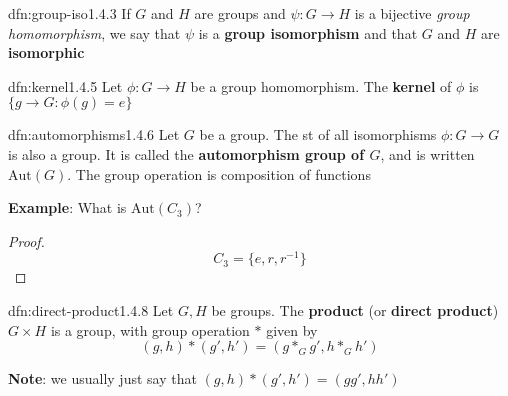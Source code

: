 \documentclass{article}
\begin{document}
\begin{dfn}{dfn:group-iso}{1.4.3}
    If $G$ and $H$ are groups and $\psi : G \to H$ is a bijective \textit{group homomorphism}, we say that $\psi$ is a \textbf{group isomorphism} and that $G$ and $H$ are \textbf{isomorphic}
\end{dfn}

\begin{dfn}{dfn:kernel}{1.4.5}
    Let $\phi : G \to H$ be a group homomorphism. The \textbf{kernel} of $\phi$ is $\{g \to G : \phi(g) = e\}$
\end{dfn}

\begin{dfn}[Automorphisms]{dfn:automorphisms}{1.4.6}
    Let $G$ be a group. The st of all isomorphisms $\phi : G \to G$ is also a group. It is called the \textbf{automorphism group of $G$}, and is written $\mathrm{Aut}(G)$. The group operation is composition of functions
\end{dfn}

\textbf{Example}: What is $\mathrm{Aut}(C_{3})$?
\begin{proof}
    \[C_{3} = \{e, r, r^{-1}\}\]
\end{proof}

\begin{dfn}{dfn:direct-product}{1.4.8}
    Let $G, H$ be groups. The \textbf{product} (or \textbf{direct product}) $G \times H$ is a group, with group operation $*$ given by
    \[(g, h) * (g', h') = (g *_{G} g', h *_{G} h')\]

    \textbf{Note}: we usually just say that $(g, h) * (g', h') = (gg', hh')$
\end{dfn}
\end{document}
